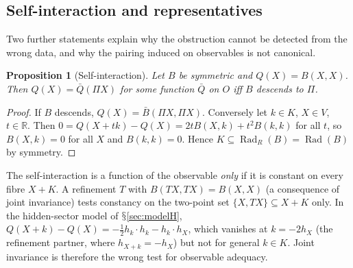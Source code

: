 \documentclass[11pt,a4paper]{article}
\renewcommand{\S}{\ensuremath{\mathsection}}
\newcommand{\RR}{\mathbb{R}}
\newcommand{\Rad}{\operatorname{Rad}}
\theoremstyle{plain}
\newtheorem{proposition}[theorem]{Proposition}
\theoremstyle{definition}
\begin{document}
\subsection{Self-interaction and representatives}\label{sec:represent}
Two further statements explain why the obstruction cannot be detected from the wrong data, and why the pairing induced on observables is not canonical.

\begin{proposition}[Self-interaction]\label{prop:self}
Let $B$ be symmetric and $Q(X)=B(X,X)$. Then $Q(X)=\bar Q(\Pi X)$ for some function $\bar Q$ on $O$ iff $B$ descends to $\Pi$.
\end{proposition}
\begin{proof}
If $B$ descends, $Q(X)=\bar B(\Pi X,\Pi X)$. Conversely let $k\in K$, $X\in V$, $t\in\RR$. Then $0=Q(X+tk)-Q(X)=2tB(X,k)+t^2B(k,k)$ for all $t$, so $B(X,k)=0$ for all $X$ and $B(k,k)=0$. Hence $K\subseteq\Rad_R(B)=\Rad(B)$ by symmetry.
\end{proof}
The self-interaction is a function of the observable \emph{only} if it is constant on every fibre $X+K$. A refinement $T$ with $B(TX,TX)=B(X,X)$ (a consequence of joint invariance) tests constancy on the two-point set $\{X,TX\}\subseteq X+K$ only. In the hidden-sector model of \S\ref{sec:modelH}, $Q(X+k)-Q(X)=-\tfrac12h_k\!\cdot h_k-h_k\!\cdot h_X$, which vanishes at $k=-2h_X$ (the refinement partner, where $h_{X+k}=-h_X$) but not for general $k\in K$. Joint invariance is therefore the wrong test for observable adequacy.
\end{document}
